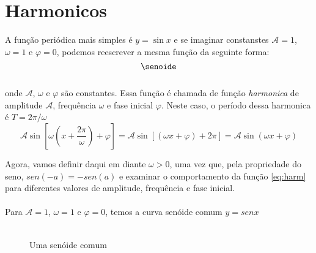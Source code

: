 \chapter{Harmonicos}

A função periódica mais simples é $y = \sin{x}$ e se imaginar constanstes $\mathcal{A} = 1$,
$\omega = 1$ e $\varphi = 0$, podemos reescrever a mesma função da seguinte forma:
\begin{equation}
\label{eq:harm}
    \senoide
\end{equation} 
\\
onde $\mathcal{A}$, $\omega$ e $\varphi$ são constantes. Essa função é chamada de função 
\textit{harmonica} de amplitude $\mathcal{A}$, frequência $\omega$ e fase
inicial $\varphi$. Neste caso, o período dessa harmonica é $T = 2\pi / \omega$
\begin{equation}
\label{harm_ex}
    \mathcal{A}\sin{\left[\omega\left(x+\dfrac{2\pi}{\omega}\right) + \varphi\right]} = \mathcal{A}\sin{[(\omega x + \varphi) + 2\pi]} = \mathcal{A}\sin{(\omega x + \varphi)}
\end{equation}


Agora, vamos definir daqui em diante $\omega > 0$, uma vez que, pela propriedade do seno, 
\mbox{$sen(-a) = - sen (a)$} e examinar o comportamento da função \ref{eq:harm} para 
diferentes valores de amplitude, frequência e fase inicial.
\\
\\


Para $\mathcal{A}=1$, $\omega = 1$ e $\varphi = 0$, temos a curva senóide comum $y = sen x$\\
\\

\begin{figure}[H]
    \caption{Uma senóide comum}
    \label{fig:senoide}
\end{figure}

